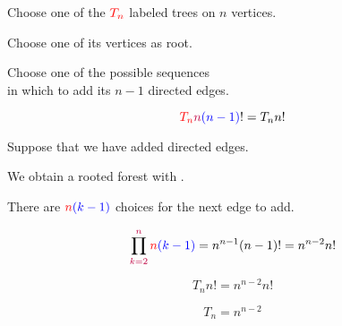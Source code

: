 \begin{frame}{}
  \begin{center}
    Choose one of the $\textcolor{red}{T_{n}}$ labeled trees on $n$ vertices.

    \pause
    \vspace{0.60cm}
    Choose one of its  vertices as root.

    \pause
    \vspace{0.60cm}
    Choose one of the  possible sequences \\
    in which to add its $n-1$ directed edges.
  \end{center}

  \[
    \textcolor{red}{T_n} \textcolor{purple}{n}\textcolor{blue}{(n-1)}! = T_n n!
  \]
\end{frame}

\begin{frame}{}
  \begin{center}
    Suppose that we have added  directed edges.

    \pause
    \vspace{0.30cm}
    We obtain a rooted forest with .

    \pause
    \vspace{0.30cm}
    There are $\textcolor{red}{n}\textcolor{blue}{(k-1)}$ choices for the next edge to add.
  \end{center}

  \pause

  \pause
  \[
    \prod_{\textcolor{purple}{k=2}}^{\textcolor{purple}{n}} \textcolor{red}{n}\textcolor{blue}{(k-1)}
      = n^{n-1} (n-1)! = n^{n-2} n!
  \]
\end{frame}

\begin{frame}{}
  \[
    T_n n! = n^{n-2}n!
  \]

  \pause
  \[
    T_{n} = n^{n-2}
  \]

  \pause
\end{frame}
